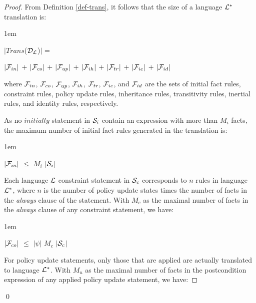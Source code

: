 \documentclass[glov2,twocolumn,final]{svjour2}
\newenvironment{vproof}
  {\begin{proof}\hspace{0.1em}}
  {\end{proof}\qed}
\newenvironment{vquote}
  {\begin{list}{}{\leftmargin 1em}\item[]}
  {\end{list}}
\begin{document}
        \begin{vproof}
          From Definition \ref{def-trans}, it follows that the size of a
          language ${\cal L}^{*}$ translation is:

          \begin{vquote}
            $|$$Trans$(${\cal D_{L}}$)$|$ =

            \hspace{1em}
            $|{\cal F}_{in}|$ $+$
            $|{\cal F}_{co}|$ $+$
            $|{\cal F}_{up}|$ $+$
            $|{\cal F}_{ih}|$ $+$
            $|{\cal F}_{tr}|$ $+$
            $|{\cal F}_{ie}|$ $+$
            $|{\cal F}_{id}|$
          \end{vquote}

          where ${\cal F}_{in}$, ${\cal F}_{co}$, ${\cal F}_{up}$,
          ${\cal F}_{ih}$, ${\cal F}_{tr}$, ${\cal F}_{ie}$, and
          ${\cal F}_{id}$ are the sets of initial fact rules, constraint rules,
          policy update rules, inheritance rules, transitivity rules,
          inertial rules, and identity rules, respectively.

          As no $initially$ statement in ${\cal S}_{i}$ contain an expression
          with more than $M_{i}$ facts, the maximum number of initial fact
          rules generated in the translation is:

          \begin{vquote}
            $|{\cal F}_{in}|$ $\leq$ $M_{i}$ $|$${\cal S}_{i}$$|$
          \end{vquote}

          Each language ${\cal L}$ constraint statement in ${\cal S}_{c}$
          corresponds to $n$ rules in language ${\cal L}^{*}$, where $n$ is
          the number of policy update states times the number of facts in the
          {\em always} clause of the statement. With $M_{c}$ as the maximal
          number of facts in the {\em always} clause of any constraint
          statement, we have:

          \begin{vquote}
            $|{\cal F}_{co}|$ $\leq$ $|\psi|$ $M_{c}$ $|$${\cal S}_{c}$$|$
          \end{vquote}

          For policy update statements, only those that are applied are
          actually translated to language ${\cal L}^{*}$. With $M_{u}$ as the
          maximal number of facts in the postcondition expression of any
          applied policy update statement, we have:


\end{vproof}
\end{document}
